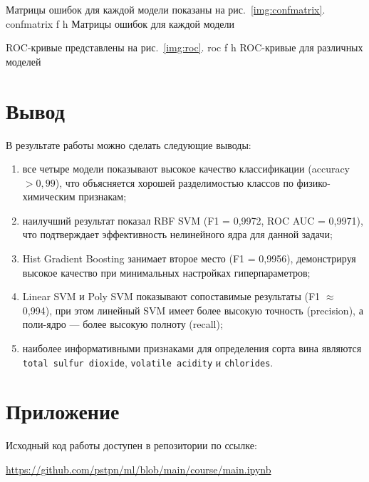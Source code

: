 \documentclass{itmo}
\begin{document}
\clearpage
Матрицы ошибок для каждой модели показаны на рис.~\ref{img:confmatrix}.
	{confmatrix}
	{f}
	{h}
	{\textwidth}
	{Матрицы ошибок для каждой модели}

\clearpage
ROC-кривые представлены на рис.~\ref{img:roc}.
	{roc}
	{f}
	{h}
	{\textwidth}
	{ROC-кривые для различных моделей}

\chapter{Вывод}

В результате работы можно сделать следующие выводы:
\begin{enumerate}
	\item все четыре модели показывают высокое качество классификации (accuracy $> 0{,}99$), что объясняется хорошей разделимостью классов по физико-химическим признакам;
	\item наилучший результат показал RBF SVM (F1 = 0{,}9972, ROC AUC = 0{,}9971), что подтверждает эффективность нелинейного ядра для данной задачи;
	\item Hist Gradient Boosting занимает второе место (F1 = 0{,}9956), демонстрируя высокое качество при минимальных настройках гиперпараметров;
	\item Linear SVM и Poly SVM показывают сопоставимые результаты (F1 $\approx$ 0{,}994), при этом линейный SVM имеет более высокую точность (precision), а поли-ядро --- более высокую полноту (recall);
	\item наиболее информативными признаками для определения сорта вина являются \texttt{total sulfur dioxide}, \texttt{volatile acidity} и \texttt{chlorides}.
\end{enumerate}

\appendix
\chapter{Приложение}

Исходный код работы доступен в репозитории по ссылке:

\medskip

\url{https://github.com/pstpn/ml/blob/main/course/main.ipynb}
\end{document}
